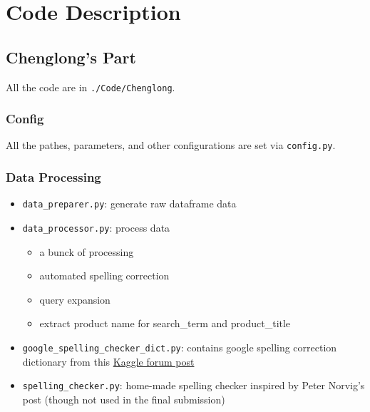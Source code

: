 \documentclass[12pt]{article}
\begin{document}

\section{Code Description}
\subsection{Chenglong's Part}
All the code are in \texttt{./Code/Chenglong}.
\subsubsection{Config}
All the pathes, parameters, and other configurations are set via \texttt{config.py}.
\subsubsection{Data Processing}
\begin{itemize}
\item \texttt{data\_preparer.py}: generate raw dataframe data
\item \texttt{data\_processor.py}: process data
\begin{itemize}
\item a bunck of processing
\item automated spelling correction
\item query expansion
\item extract product name for search\_term and product\_title
\end{itemize}
\item \texttt{google\_spelling\_checker\_dict.py}: contains google spelling correction dictionary from this \href{https://www.kaggle.com/steubk/home-depot-product-search-relevance/fixing-typos}{Kaggle forum post}
\item \texttt{spelling\_checker.py}: home-made spelling checker inspired by Peter Norvig's post\cite{PeterNorvig} (though not used in the final submission)
\end{itemize}
\end{document}
